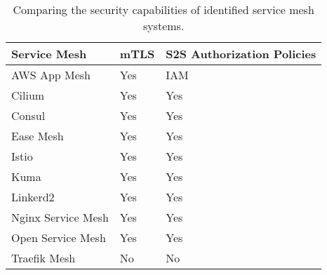 \begin{table*}[t]
\centering
\begin{tabular}{l|ll}
\toprule
Service Mesh       & mTLS & S2S Authorization Policies \\
\midrule
AWS App Mesh       & Yes  & IAM                        \\
Cilium             & Yes  & Yes                        \\
Consul             & Yes  & Yes                        \\
Ease Mesh          & Yes  & Yes                        \\
Istio              & Yes  & Yes                        \\
Kuma               & Yes  & Yes                        \\
Linkerd2           & Yes  & Yes                        \\
Nginx Service Mesh & Yes  & Yes                        \\
Open Service Mesh  & Yes  & Yes                        \\
Traefik Mesh       & No   & No                          \\
\bottomrule
\end{tabular}
\caption{Comparing the security capabilities of identified service mesh systems.}
\label{tab:result-security}
\end{table*}

